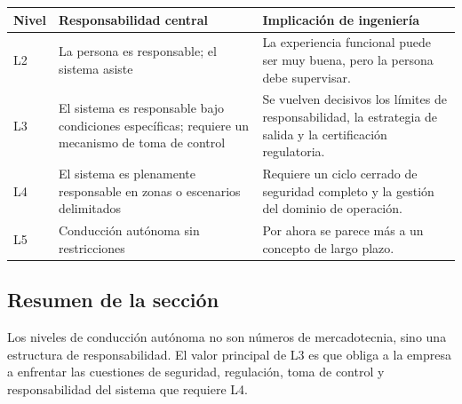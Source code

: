 \noindent\begin{tabularx}{\textwidth}{p{}p{}X}
\toprule
Nivel & Responsabilidad central & Implicación de ingeniería \\
\midrule
L2 & La persona es responsable; el sistema asiste & La experiencia funcional puede ser muy buena, pero la persona debe supervisar. \\
L3 & El sistema es responsable bajo condiciones específicas; requiere un mecanismo de toma de control & Se vuelven decisivos los límites de responsabilidad, la estrategia de salida y la certificación regulatoria. \\
L4 & El sistema es plenamente responsable en zonas o escenarios delimitados & Requiere un ciclo cerrado de seguridad completo y la gestión del dominio de operación. \\
L5 & Conducción autónoma sin restricciones & Por ahora se parece más a un concepto de largo plazo. \\
\bottomrule
\end{tabularx}

\subsection{Resumen de la sección}

Los niveles de conducción autónoma no son números de mercadotecnia, sino una estructura de responsabilidad. El valor principal de L3 es que obliga a la empresa a enfrentar las cuestiones de seguridad, regulación, toma de control y responsabilidad del sistema que requiere L4.
